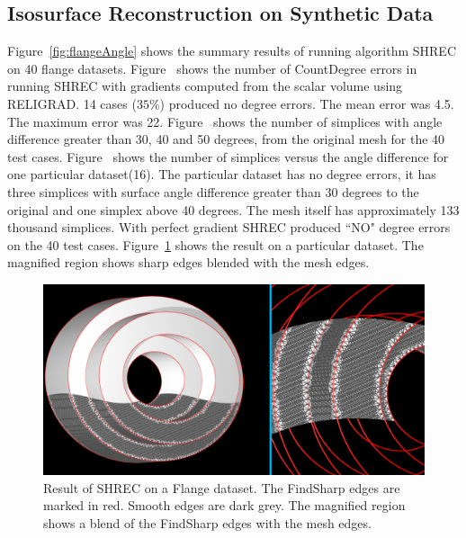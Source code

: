\subsection{Isosurface Reconstruction on Synthetic Data}
Figure~\ref{fig:flangeAngle} shows the summary results of running algorithm SHREC on 40 flange datasets. Figure~\protect{} shows the number of CountDegree errors in running SHREC with gradients computed from the scalar volume using RELIGRAD.
14 cases ($35\%$) produced no degree errors. The mean error was 4.5. The maximum error was 22.
Figure~\protect{} shows the number of simplices with angle difference greater than 30, 40 and 50 degrees, from the original mesh for the 40 test cases. Figure~\protect{} shows  the number of simplices versus the angle difference for one particular dataset(16). The particular dataset has no degree errors, it has three simplices with surface angle difference greater than 30 degrees to the original and one simplex above 40 degrees. The mesh itself has approximately 133 thousand simplices. With perfect gradient SHREC produced ``NO" degree errors on the 40 test cases. 
Figure~\ref{fig:flange1} shows the result on a particular dataset. The magnified region shows sharp edges blended with the mesh edges. 
\begin{figure}[tb]
\includegraphics[width=\linewidth]{images/shrecFlangeCombine2.eps}
\caption{Result of SHREC on a Flange dataset. The FindSharp edges are marked in red. 
	Smooth edges are dark grey. The magnified region shows a blend of the FindSharp edges with the mesh edges.}
\label{fig:flange1}
\end{figure}
	 
